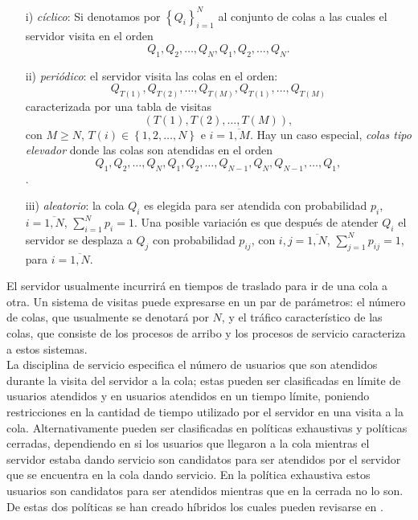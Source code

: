 \documentclass{article}
\numberwithin{equation}{section}
\begin{document}
\begin{itemize}
\item[i)] {\em c\'iclico}: Si denotamos por $\left\{Q_{i}\right\}_{i=1}^{N}$ al conjunto de colas a las cuales el servidor visita en el orden \[Q_{1},Q_{2},\ldots,Q_{N},Q_{1},Q_{2},\ldots,Q_{N}.\]

\item[ii)] {\em peri\'odico}: el servidor visita las colas en el orden:
\[Q_{T\left(1\right)},Q_{T\left(2\right)},\ldots,Q_{T\left(M\right)},Q_{T\left(1\right)},\ldots,Q_{T\left(M\right)}\]
caracterizada por una tabla de visitas
\[\left(T\left(1\right),T\left(2\right),\ldots,T\left(M\right)\right),\]
con $M\geq N$, $T\left(i\right)\in\left\{1,2,\ldots,N\right\}$ e $i=\overline{1,M}$. Hay un caso especial, {\em colas tipo elevador} donde las colas son atendidas en el orden \[Q_{1},Q_{2},\ldots,Q_{N},Q_{1},Q_{2},\ldots,Q_{N-1},Q_{N},Q_{N-1},\ldots,Q_{1},\].

\item[iii)] {\em aleatorio}: la cola $Q_{i}$ es elegida para ser atendida con probabilidad $p_{i}$, $i=\overline{1,N}$, $\sum_{i=1}^{N}p_{i}=1$. Una posible variaci\'on es que despu\'es de atender $Q_{i}$ el servidor se desplaza a $Q_{j}$ con probabilidad $p_{ij}$, con $i,j=\overline{1,N}$, $\sum_{j=1}^{N}p_{ij}=1$, para $i=\overline{1,N}$.
\end{itemize}

El servidor usualmente incurrir\'a en tiempos de traslado para ir de una cola a otra. Un sistema de visitas puede expresarse en un par de par\'ametros: el n\'umero de colas, que usualmente se denotar\'a por $N$, y el tr\'afico caracter\'istico de las colas, que consiste de los procesos de arribo y los procesos de servicio caracteriza a estos sistemas.\\

La disciplina de servicio especifica el n\'umero de usuarios que son atendidos durante la visita del servidor a la cola; estas pueden ser clasificadas en l\'imite de usuarios atendidos y en usuarios atendidos en un tiempo l\'imite, poniendo restricciones en la cantidad de tiempo utilizado por el servidor en una visita a la cola. Alternativamente pueden ser clasificadas en pol\'iticas exhaustivas y pol\'iticas cerradas, dependiendo en si los usuarios que llegaron a la cola mientras el servidor estaba dando servicio son candidatos para ser atendidos por el servidor que se encuentra en la cola dando servicio. En la pol\'itica exhaustiva estos usuarios son candidatos para ser atendidos mientras que en la cerrada no lo son. De estas dos pol\'iticas se han creado h\'ibridos los cuales pueden revisarse en \cite{BoonMeiWinands}.\\
\end{document}
